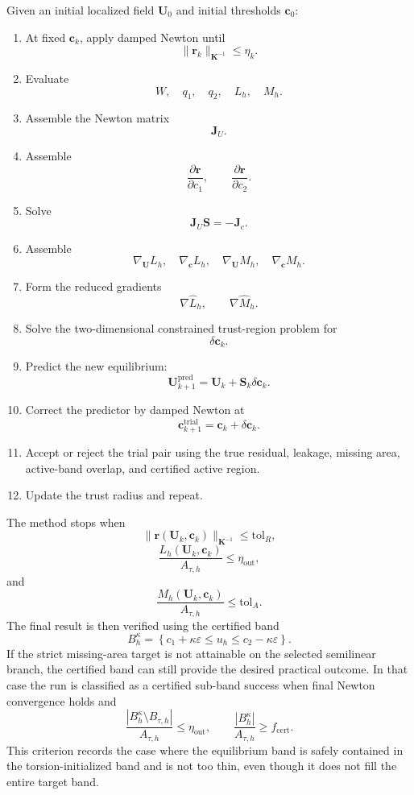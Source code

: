 \documentclass[11pt]{article}
\newcommand{\bU}{\mathbf{U}}
\newcommand{\bc}{\mathbf{c}}
\newcommand{\br}{\mathbf{r}}
\newcommand{\bK}{\mathbf{K}}
\newcommand{\bJ}{\mathbf{J}}
\newcommand{\bS}{\mathbf{S}}
\begin{document}
Given an initial localized field $\bU_0$ and initial thresholds $\bc_0$:
\begin{enumerate}[leftmargin=2.2em]
\item At fixed $\bc_k$, apply damped Newton until
\[
\|\br_k\|_{\bK^{-1}}\leq\eta_k.
\]

\item Evaluate
\[
W,\quad q_1,\quad q_2,
\quad L_h,\quad M_h.
\]

\item Assemble the Newton matrix
\[
\bJ_U.
\]

\item Assemble
\[
\frac{\partial\br}{\partial c_1},
\qquad
\frac{\partial\br}{\partial c_2}.
\]

\item Solve
\[
\bJ_U\bS=-\bJ_c.
\]

\item Assemble
\[
\nabla_{\bU}L_h,
\quad
\nabla_{\bc}L_h,
\quad
\nabla_{\bU}M_h,
\quad
\nabla_{\bc}M_h.
\]

\item Form the reduced gradients
\[
\nabla\widehat L_h,
\qquad
\nabla\widehat M_h.
\]

\item Solve the two-dimensional constrained trust-region problem for
\[
\delta\bc_k.
\]

\item Predict the new equilibrium:
\[
\bU_{k+1}^{\mathrm{pred}}
=
\bU_k+\bS_k\delta\bc_k.
\]

\item Correct the predictor by damped Newton at
\[
\bc_{k+1}^{\mathrm{trial}}
=
\bc_k+\delta\bc_k.
\]

\item Accept or reject the trial pair using the true residual, leakage, missing area, active-band overlap, and certified active region.

\item Update the trust radius and repeat.
\end{enumerate}
The method stops when
\[
\|\br(\bU_k,\bc_k)\|_{\bK^{-1}}
\leq
\mathrm{tol}_R,
\]
\[
\frac{L_h(\bU_k,\bc_k)}{A_{\tau,h}}
\leq
\eta_{\mathrm{out}},
\]
and
\[
\frac{M_h(\bU_k,\bc_k)}{A_{\tau,h}}
\leq
\mathrm{tol}_A.
\]
The final result is then verified using the certified band
\[
B_h^\kappa
=
\left\{
c_1+\kappa\varepsilon
\leq u_h
\leq
c_2-\kappa\varepsilon
\right\}.
\]
If the strict missing-area target is not attainable on the selected
semilinear branch, the certified band can still provide the desired practical
outcome.  In that case the run is classified as a certified sub-band success
when final Newton convergence holds and
\[
\frac{|B_h^\kappa\setminus B_{\tau,h}|}{A_{\tau,h}}
\leq
\eta_{\mathrm{out}},
\qquad
\frac{|B_h^\kappa|}{A_{\tau,h}}
\geq
f_{\mathrm{cert}}.
\]
This criterion records the case where the equilibrium band is safely contained
in the torsion-initialized band and is not too thin, even though it does not
fill the entire target band.
\end{document}
